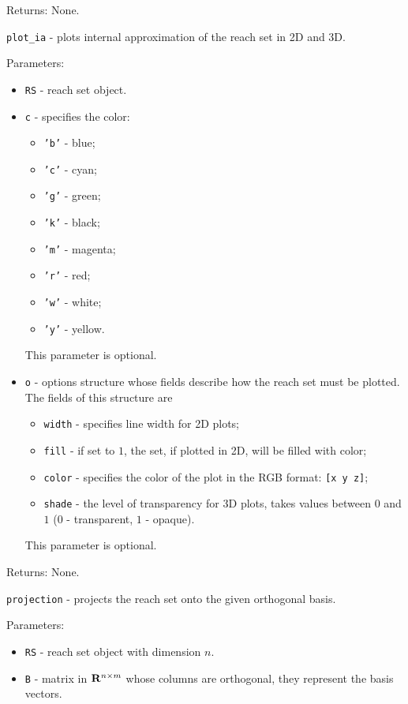 Returns: None.

\newpage

{\Large {\tt plot\_ia}} - plots internal approximation of the reach set
in 2D and 3D.

Parameters:
\begin{itemize}
\item {\tt RS} - reach set object.
\item {\tt c} - specifies the color:
\begin{itemize}
\item {\tt 'b'} - blue;
\item {\tt 'c'} - cyan;
\item {\tt 'g'} - green;
\item {\tt 'k'} - black;
\item {\tt 'm'} - magenta;
\item {\tt 'r'} - red;
\item {\tt 'w'} - white;
\item {\tt 'y'} - yellow.
\end{itemize}
This parameter is optional.
\item {\tt o} - options structure whose fields describe how the reach set
must be plotted. The fields of this structure are
\begin{itemize}
\item {\tt width} - specifies line width for 2D plots;
\item {\tt fill} - if set to $1$, the set, if plotted in 2D,
will be filled with color;
\item {\tt color} - specifies the color of the plot in the RGB format:
{\tt [x y z]};
\item {\tt shade} - the level of transparency for 3D plots, takes values
between $0$ and $1$ ($0$ - transparent, $1$ - opaque).
\end{itemize}
This parameter is optional.
\end{itemize}

Returns: None.

\newpage

{\Large {\tt projection}} - projects the reach set onto the given orthogonal
basis.

Parameters:
\begin{itemize}
\item {\tt RS} - reach set object with dimension $n$.
\item {\tt B} - matrix in ${\bf R}^{n\times m}$ whose columns are orthogonal,
they represent the basis vectors.
\end{itemize}

